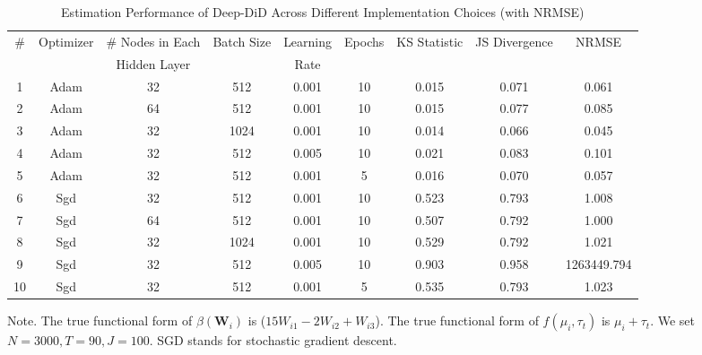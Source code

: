 \begin{table}[h!tbp]
\caption{Estimation Performance of Deep-DiD Across Different Implementation Choices (with NRMSE)}\label{tab:sim_hyperparam_nrmse}
\scriptsize
{\def\arraystretch{1.2}  
\begin{tabular}{ccccccccc}
\hline\hline
\multirow{2}{*}{\centering \#} & \multirow{2}{*}{\centering Optimizer} & \# Nodes in Each & \multirow{2}{*}{\centering Batch Size} & Learning & \multirow{2}{*}{\centering Epochs} &  \multirow{2}{*}{\centering KS Statistic} & \multirow{2}{*}{\centering JS Divergence} & \multirow{2}{*}{\centering NRMSE}          \\
&   & Hidden Layer     &                             & Rate     &                               &                               &  &  \\
\hline
1  & Adam      & 32         & 512        & 0.001         & 10     & 0.015        & 0.071         & 0.061         \\
2  & Adam      & 64         & 512        & 0.001         & 10     & 0.015        & 0.077         & 0.085         \\
3  & Adam      & 32         & 1024        & 0.001         & 10     & 0.014        & 0.066         & 0.045         \\
4  & Adam      & 32         & 512        & 0.005         & 10     & 0.021        & 0.083         & 0.101         \\
5  & Adam      & 32         & 512        & 0.001         & 5     & 0.016        & 0.070         & 0.057         \\
6  & Sgd      & 32         & 512        & 0.001         & 10     & 0.523        & 0.793         & 1.008         \\
7  & Sgd      & 64         & 512        & 0.001         & 10     & 0.507        & 0.792         & 1.000         \\
8  & Sgd      & 32         & 1024        & 0.001         & 10     & 0.529        & 0.792         & 1.021         \\
9  & Sgd      & 32         & 512        & 0.005         & 10     & 0.903        & 0.958         & 1263449.794         \\
10  & Sgd      & 32         & 512        & 0.001         & 5     & 0.535        & 0.793         & 1.023         \\
\hline\hline
\end{tabular}
}
\parbox{\linewidth}{
\vspace{1eX} 
\scriptsize Note. The true functional form of $\beta(\mathbf{W}_{i})$ is ($15W_{i1} - 2W_{i2} + W_{i3}$). The true functional form of $f(\mu_i, \tau_t)$ is $\mu_i + \tau_t$. We set $N=3000, T=90, J=100$. SGD stands for stochastic gradient descent.}
\end{table}